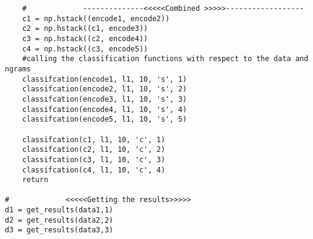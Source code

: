 \documentclass[12pt]{article}
\begin{document}
\begin{enumerate}
\begin{flushleft}
\begin{lstlisting}
    #             --------------<<<<<Combined >>>>>------------------
    c1 = np.hstack((encode1, encode2))
    c2 = np.hstack((c1, encode3))
    c3 = np.hstack((c2, encode4))
    c4 = np.hstack((c3, encode5))
    #calling the classification functions with respect to the data and ngrams
    classifcation(encode1, l1, 10, 's', 1)
    classifcation(encode2, l1, 10, 's', 2)
    classifcation(encode3, l1, 10, 's', 3)
    classifcation(encode4, l1, 10, 's', 4)
    classifcation(encode5, l1, 10, 's', 5)

    classifcation(c1, l1, 10, 'c', 1)
    classifcation(c2, l1, 10, 'c', 2)
    classifcation(c3, l1, 10, 'c', 3)
    classifcation(c4, l1, 10, 'c', 4)
    return

#             <<<<<Getting the results>>>>>
d1 = get_results(data1,1)
d2 = get_results(data2,2)
d3 = get_results(data3,3)




\end{lstlisting}
\end{flushleft}
\end{enumerate}
\end{document}
